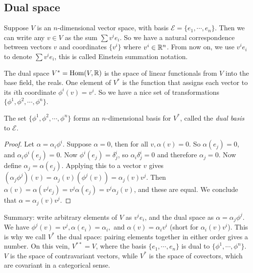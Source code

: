 \subsection{Dual space}
Suppose $V$ is an $n$-dimensional vector space, with basis $\mathcal{E} =\{e_1,\cdots ,e_n \} $. Then we can write any $v \in V$ as the sum $\sum v^i e_i $. So we have a natural correspondence between vectors $v$ and coordinates $\{v^i \} $ where $v^i  \in \mathbb{R}^n $. From now on, we use $v^i e_i $ to denote $\sum v^i e_i $, this is called Einstein summation notation.

The dual space $V^*= \operatorname{Hom}(V, \mathbb{R})$ is the space of linear functionals from $V$ into the base field, the reals. One element of $V^*$ is the function that assigns each vector to its $i$th coordinate $\phi^i (v)=v^i $. So we have a nice set of transformations $\{\phi^1,\phi ^2,\cdots , \phi ^n \} $.
\begin{claim}
    The set $\{\phi^1,\phi^2,\cdots ,\phi^n \} $ forms an $n$-dimensional basis for $V^*$, called the \emph{dual basis} to $\mathcal{E} $.
\end{claim}
\begin{proof}
    Let $\alpha =\alpha _i \phi^i $. Suppose $\alpha =0$, then for all $v, \alpha (v)=0$. So $\alpha(e_j )=0$, and $\alpha _i \phi ^i (e_j )=0$. Now $\phi^i (e_j )=\delta^i _j $, so $\alpha _i \delta^i _j =0$ and therefore $\alpha _j =0$. Now define $\alpha _j =\alpha (e_j )$. Applying this to a vector $v$ gives $(\alpha _j  \phi^j)(v)=\alpha _j(v) (\phi ^j(v))=\alpha _j(v) v^j$. Then $\alpha (v)=\alpha (v^je_j )=v^j \alpha (e_j )=v^j\alpha _j(v) $, and these are equal. We conclude that $\alpha =\alpha _j(v) v^j$.
\end{proof}
Summary: write arbitrary elements of $V$ as $v^i e_i $, and the dual space as $\alpha =\alpha _j \phi ^j$. We have $\phi^j(v)=v^j, \alpha (e_i )=\alpha _i ,$ and $\alpha (v)=\alpha_i v^i $ (short for $\alpha _i (v)v^i $). This is why we call $V^*$ the dual space: pairing elements together in either order gives a number. On this vein, $V^{* *}=V$, where the basis $\{e_1,\cdots ,e_n \} $ is dual to $\{\phi^1,\cdots ,\phi^n \} $. $V$ is the space of contravariant vectors, while $V^*$ is the space of covectors, which are covariant in a categorical sense. 


